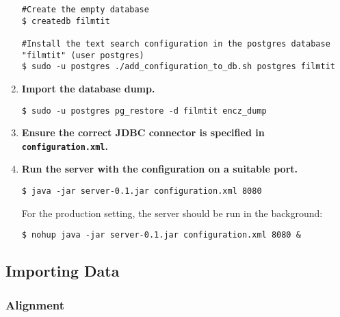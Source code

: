 \begin{enumerate}
\begin{lstlisting}
#Create the empty database
$ createdb filmtit

#Install the text search configuration in the postgres database "filmtit" (user postgres)
$ sudo -u postgres ./add_configuration_to_db.sh postgres filmtit
\end{lstlisting}
\vspace*{0.5em}

\item \textbf{Import the database dump.}
\vspace*{0.5em}
\begin{lstlisting}
$ sudo -u postgres pg_restore -d filmtit encz_dump
\end{lstlisting}
\vspace*{0.5em}

\item \textbf{Ensure the correct JDBC connector is specified in {\tt configuration.xml}.}
\item \textbf{Run the server with the configuration on a suitable port.} 
\vspace*{0.5em}
\begin{lstlisting}
$ java -jar server-0.1.jar configuration.xml 8080
\end{lstlisting}
\vspace*{0.5em}

For the production setting, the server should be run in the background:
\vspace*{0.5em}
\begin{lstlisting}
$ nohup java -jar server-0.1.jar configuration.xml 8080 &
\end{lstlisting}
\vspace*{0.5em}






\end{enumerate}



\subsection{Importing Data}

\label{sec:import}

\subsubsection{Alignment}

